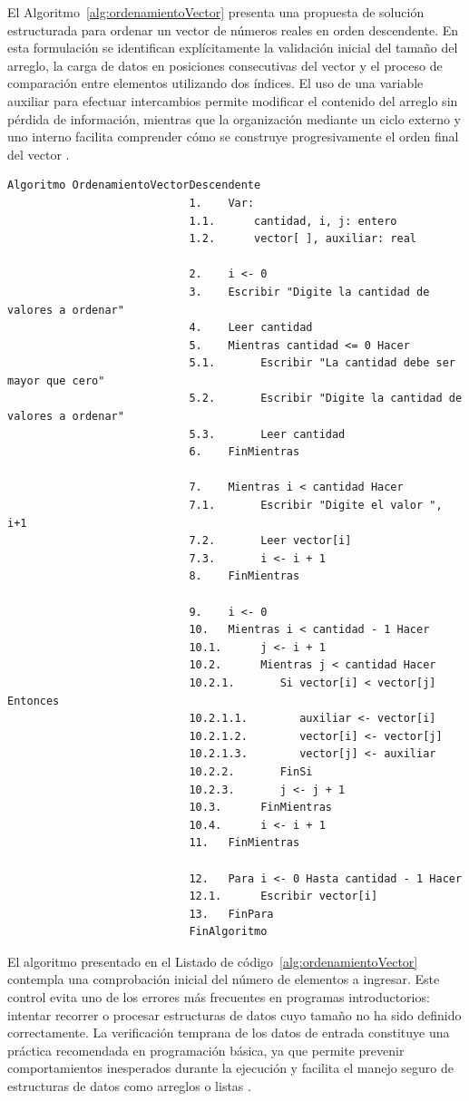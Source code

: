 \documentclass[12pt,twoside]{book}
\begin{document}
						\noindent
						El Algoritmo~\ref{alg:ordenamientoVector} presenta una propuesta de solución estructurada para ordenar un vector de números reales en orden descendente. En esta formulación se identifican explícitamente la validación inicial del tamaño del arreglo, la carga de datos en posiciones consecutivas del vector y el proceso de comparación entre elementos utilizando dos índices. El uso de una variable auxiliar para efectuar intercambios permite modificar el contenido del arreglo sin pérdida de información, mientras que la organización mediante un ciclo externo y uno interno facilita comprender cómo se construye progresivamente el orden final del vector \cite{Cormen2022Introduction,Qian2018Students}.
						
						\begin{lstlisting}[style=upsamStyle,caption={Ordenamiento descendente de un vector de números reales},label={alg:ordenamientoVector}]
							Algoritmo OrdenamientoVectorDescendente
							1.    Var:
							1.1.      cantidad, i, j: entero
							1.2.      vector[ ], auxiliar: real
							
							2.    i <- 0
							3.    Escribir "Digite la cantidad de valores a ordenar"
							4.    Leer cantidad
							5.    Mientras cantidad <= 0 Hacer
							5.1.       Escribir "La cantidad debe ser mayor que cero"
							5.2.       Escribir "Digite la cantidad de valores a ordenar"
							5.3.       Leer cantidad
							6.    FinMientras
							
							7.    Mientras i < cantidad Hacer
							7.1.       Escribir "Digite el valor ", i+1
							7.2.       Leer vector[i]
							7.3.       i <- i + 1
							8.    FinMientras
							
							9.    i <- 0
							10.   Mientras i < cantidad - 1 Hacer
							10.1.      j <- i + 1
							10.2.      Mientras j < cantidad Hacer
							10.2.1.       Si vector[i] < vector[j] Entonces
							10.2.1.1.        auxiliar <- vector[i]
							10.2.1.2.        vector[i] <- vector[j]
							10.2.1.3.        vector[j] <- auxiliar
							10.2.2.       FinSi
							10.2.3.       j <- j + 1
							10.3.      FinMientras
							10.4.      i <- i + 1
							11.   FinMientras
							
							12.   Para i <- 0 Hasta cantidad - 1 Hacer
							12.1.      Escribir vector[i]
							13.   FinPara
							FinAlgoritmo
						\end{lstlisting}
						
						\noindent
						El algoritmo presentado en el Listado de código~\ref{alg:ordenamientoVector} contempla una comprobación inicial del número de elementos a ingresar. Este control evita uno de los errores más frecuentes en programas introductorios: intentar recorrer o procesar estructuras de datos cuyo tamaño no ha sido definido correctamente. La verificación temprana de los datos de entrada constituye una práctica recomendada en programación básica, ya que permite prevenir comportamientos inesperados durante la ejecución y facilita el manejo seguro de estructuras de datos como arreglos o listas \cite{Gaddis2022Starting,Farrell2018Programming,Seacord2013Secure}.
\end{document}
